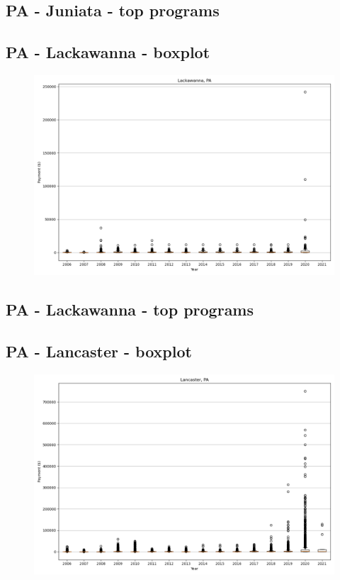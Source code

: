 \subsection*{PA - Juniata - top programs}

\newpage
\subsection*{PA - Lackawanna - boxplot}
\begin{figure}[h]
\centering
\includegraphics[width=7in]{../output/boxplots/counties/Lackawanna-PA_boxplot.png}
\end{figure}


\subsection*{PA - Lackawanna - top programs}

\newpage
\subsection*{PA - Lancaster - boxplot}
\begin{figure}[h]
\centering
\includegraphics[width=7in]{../output/boxplots/counties/Lancaster-PA_boxplot.png}
\end{figure}


